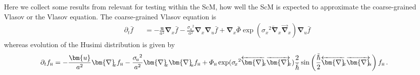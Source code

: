 \documentclass[twocolumn, nofootinbib, showpacs, superscriptaddress]{revtex4-1}
\renewcommand{\H}[0]{{\textsc{h}}}
\newcommand{\sigu}{{\sigma_{\! u}}}
\newcommand{\sigx}{{\sigma_{\! x}}}
\newcommand{\thbar}{\tilde\hbar}
\newcommand{\vu}[0]{\bm{u} }
\newcommand{\vnabla}[0]{\bm{\nabla} }
\begin{document}
\begin{widetext}
 Here we collect some results from \cite{UhlemannKoppHaugg2014} relevant for testing within the ScM,
 how well the ScM is expected to approximate the coarse-grained Vlasov or the Vlasov equation.  The coarse-grained Vlasov equation is
 \begin{subequations}
\label{cgVlasovEq}
\begin{eqnarray} 
\partial_t  \bar f&&= -\frac{\vu}{a^2 }\vnabla_{\! \!  x}  \bar f -\frac{\sigu^2}{a^2 }\vnabla_{\! \!  x}\vnabla_{\! \!  u}  \bar f  +\vnabla_{\! \!  x} \bar \varPhi \exp(\sigx^2\overleftarrow{\vnabla}_{\! \!  x}\overrightarrow{\vnabla}_{\! \!  x})\vnabla_{\! \!  u}  \bar f \label{cgVlasovEqa} \,
\end{eqnarray}
\end{subequations}
%
whereas evolution of the Husimi distribution is given by
\begin{subequations}
\label{cgWignerVlasov} 
\begin{align}
\partial_t   f_\H &= -\frac{\vu}{a^2}\vnabla_{\! \!  x}   f_\H -\frac{\sigu^2}{a^2 }\vnabla_{\! \!  x}\vnabla_{\! \!  u}   f_\H  +   \varPhi_\H \exp(\sigx^2\overleftarrow{\vnabla}_{\! \!  x}  \overrightarrow{\vnabla}_{\! \!  x})\frac{2}{\thbar}\sin\left(\frac{\thbar}{2}\overleftarrow{\vnabla}_{\! \!  x}  \overrightarrow{\vnabla}_{\! \!  u}\right)   f_\H \label{cgWignerVlasov1} \,.
\end{align}
\end{subequations}

\end{widetext}
\end{document}
